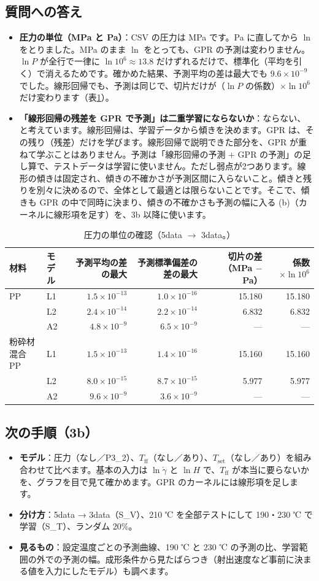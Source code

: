 \documentclass[paper=a4paper,fontsize=10.5pt,line_length=44zw,number_of_lines=38]{jlreq}
\newcommand{\file}[1]{\texttt{\detokenize{#1}}}
\newcommand{\gd}{\dot{\gamma}}
\newcommand{\PII}{P3\_2}
\newcommand{\Tff}{T_{\mathrm{ff}}}
\newcommand{\Tset}{T_{\mathrm{set}}}
\newenvironment{points}{\begin{itemize}[label=$\triangleright$,leftmargin=1.5\zw,itemsep=0.3ex,topsep=0.5ex,parsep=0pt]}{\end{itemize}}
\newcommand{\pt}[1]{\item \textbf{#1}：}
\begin{document}
\subsection{質問への答え}
\begin{points}
\pt{圧力の単位（MPa と Pa）}CSV の圧力は MPa です。Pa に直してから $\ln$ をとりました。MPa のまま $\ln$ をとっても、GPR の予測は変わりません。$\ln P$ が全行で一律に $\ln 10^6 \approx 13.8$ だけずれるだけで、標準化（平均を引く）で消えるためです。確かめた結果、予測平均の差は最大でも $9.6\times10^{-9}$ でした。線形回帰でも、予測は同じで、切片だけが（$\ln P$ の係数）$\times \ln 10^6$ だけ変わります（表\ref{tab:unit}）。
\pt{「線形回帰の残差を GPR で予測」は二重学習にならないか}ならない、と考えています。線形回帰は、学習データから傾きを決めます。GPR は、その残り（残差）だけを学びます。線形回帰で説明できた部分を、GPR が重ねて学ぶことはありません。予測は「線形回帰の予測 $+$ GPR の予測」の足し算で、テストデータは学習に使いません。ただし弱点が2つあります。線形の傾きは固定され、傾きの不確かさが予測区間に入らないこと。傾きと残りを別々に決めるので、全体として最適とは限らないことです。そこで、傾きも GPR の中で同時に決まり、傾きの不確かさも予測の幅に入る (b)（カーネルに線形項を足す）を、3b 以降に使います。
\end{points}

\begin{table}[H]
\caption{圧力の単位の確認（5data $\to$ 3data。\file{unit_check.csv}）}\label{tab:unit}
\begin{tabularx}{\linewidth}{@{}l>{\raggedright\arraybackslash}p{3\zw}rrrr@{}}
\toprule
材料 & モデル & 予測平均の差の最大 & 予測標準偏差の差の最大 & 切片の差（MPa $-$ Pa） & 係数 $\times\ln 10^6$ \\
\midrule
PP & L1 & $1.5\times10^{-13}$ & $1.0\times10^{-16}$ & 15.180 & 15.180 \\
 & L2 & $2.4\times10^{-14}$ & $2.2\times10^{-14}$ & 6.832 & 6.832 \\
 & A2 & $4.8\times10^{-9}$ & $6.5\times10^{-9}$ & --- & --- \\
粉砕材混合PP & L1 & $1.5\times10^{-13}$ & $1.4\times10^{-16}$ & 15.160 & 15.160 \\
 & L2 & $8.0\times10^{-15}$ & $8.7\times10^{-15}$ & 5.977 & 5.977 \\
 & A2 & $9.6\times10^{-9}$ & $3.6\times10^{-9}$ & --- & --- \\
\bottomrule
\end{tabularx}
\end{table}

\subsection{次の手順（3b）}
\begin{points}
\pt{モデル}圧力（なし／\PII）、$\Tff$（なし／あり）、$\Tset$（なし／あり）を組み合わせて比べます。基本の入力は $\ln\gd$ と $\ln H$ で、$\Tff$ が本当に要らないかを、グラフを目で見て確かめます。GPR のカーネルには線形項を足します。
\pt{分け方}5data → 3data（S\_V）、210 ℃ を全部テストにして 190・230 ℃ で学習（S\_T）、ランダム 20\%。
\pt{見るもの}設定温度ごとの予測曲線、190 ℃ と 230 ℃ の予測の比、学習範囲の外での予測の幅。成形条件から見たばらつき（射出速度など事前に決まる値を入力にしたモデル）も調べます。
\end{points}
\end{document}
